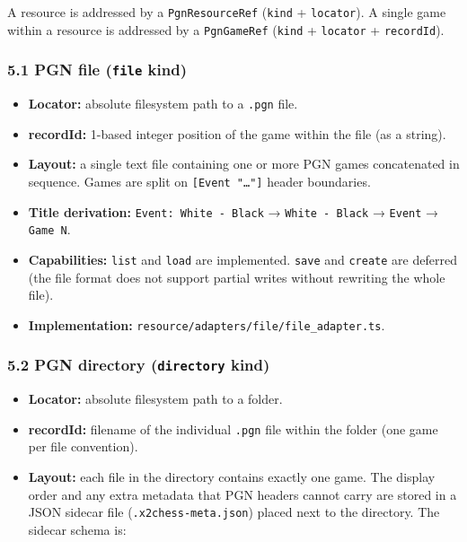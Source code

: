 \documentclass[]{article}
\providecommand{\tightlist}{%
  \setlength{\itemsep}{0pt}\setlength{\parskip}{0pt}}
\begin{document}
A resource is addressed by a \texttt{PgnResourceRef} (\texttt{kind} +
\texttt{locator}). A single game within a resource is addressed by a
\texttt{PgnGameRef} (\texttt{kind} + \texttt{locator} +
\texttt{recordId}).

\subsubsection{\texorpdfstring{5.1 PGN file (\texttt{file}
kind)}{5.1 PGN file (file kind)}}\label{pgn-file-file-kind}

\begin{itemize}
\tightlist
\item
  \textbf{Locator:} absolute filesystem path to a \texttt{.pgn} file.
\item
  \textbf{recordId:} 1-based integer position of the game within the
  file (as a string).
\item
  \textbf{Layout:} a single text file containing one or more PGN games
  concatenated in sequence. Games are split on
  \texttt{{[}Event\ "\ldots{}"{]}} header boundaries.
\item
  \textbf{Title derivation:} \texttt{Event:\ White\ -\ Black} →
  \texttt{White\ -\ Black} → \texttt{Event} → \texttt{Game\ N}.
\item
  \textbf{Capabilities:} \texttt{list} and \texttt{load} are
  implemented. \texttt{save} and \texttt{create} are deferred (the file
  format does not support partial writes without rewriting the whole
  file).
\item
  \textbf{Implementation:}
  \texttt{resource/adapters/file/file\_adapter.ts}.
\end{itemize}

\subsubsection{\texorpdfstring{5.2 PGN directory (\texttt{directory}
kind)}{5.2 PGN directory (directory kind)}}\label{pgn-directory-directory-kind}

\begin{itemize}
\tightlist
\item
  \textbf{Locator:} absolute filesystem path to a folder.
\item
  \textbf{recordId:} filename of the individual \texttt{.pgn} file
  within the folder (one game per file convention).
\item
  \textbf{Layout:} each file in the directory contains exactly one game.
  The display order and any extra metadata that PGN headers cannot carry
  are stored in a JSON sidecar file (\texttt{.x2chess-meta.json}) placed
  next to the directory. The sidecar schema is:
\end{itemize}
\end{document}

